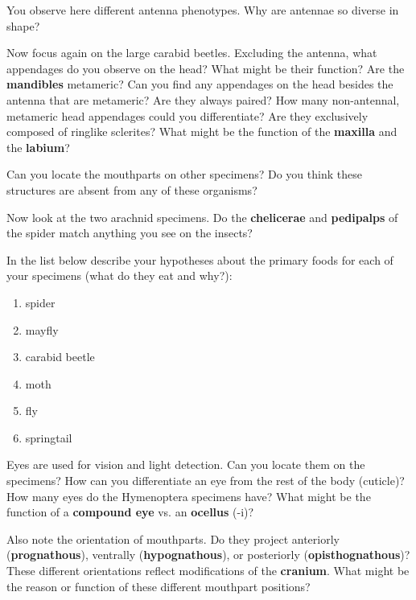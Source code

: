 \documentclass[letterpaper, 11pt]{article}
\begin{document}
\noindent{}You observe here different antenna phenotypes. Why are antennae so diverse in shape?
\vspace{30 mm}

\noindent{}Now focus again on the large carabid beetles. Excluding the antenna, what appendages do you observe on the head? What might be their function? Are the \textbf{mandibles} metameric? Can you find any appendages on the head besides the antenna that are metameric? Are they always paired? How many non-antennal, metameric head appendages could you differentiate? Are they exclusively composed of ringlike sclerites? What might be the function of the \textbf{maxilla} and the \textbf{labium}?
\vspace{30 mm}

\noindent{}Can you locate the mouthparts on other specimens? Do you think these structures are absent from any of these organisms?
\vspace{30 mm}

\noindent{}Now look at the two arachnid specimens. Do the \textbf{chelicerae} and \textbf{pedipalps} of the spider match anything you see on the insects?
\vspace{30 mm}

\noindent{}In the list below describe your hypotheses about the primary foods for each of your specimens (what do they eat and why?):
\begin{enumerate}
\item spider 
\item mayfly 
\item carabid beetle
\item moth 
\item fly
\item springtail
\end{enumerate}

\noindent{}Eyes are used for vision and light detection. Can you locate them on the specimens? How can you differentiate an eye from the rest of the body (cuticle)? How many eyes do the Hymenoptera specimens have? What might be the function of a \textbf{compound eye} vs. an \textbf{ocellus} (-i)?
\vspace{30 mm}

\noindent{}Also note the orientation of mouthparts. Do they project anteriorly (\textbf{prognathous}), ventrally (\textbf{hypognathous}), or posteriorly (\textbf{opisthognathous})? These different orientations reflect modifications of the \textbf{cranium}. What might be the reason or function of these different mouthpart positions?
\vspace{30 mm}
\end{document}
